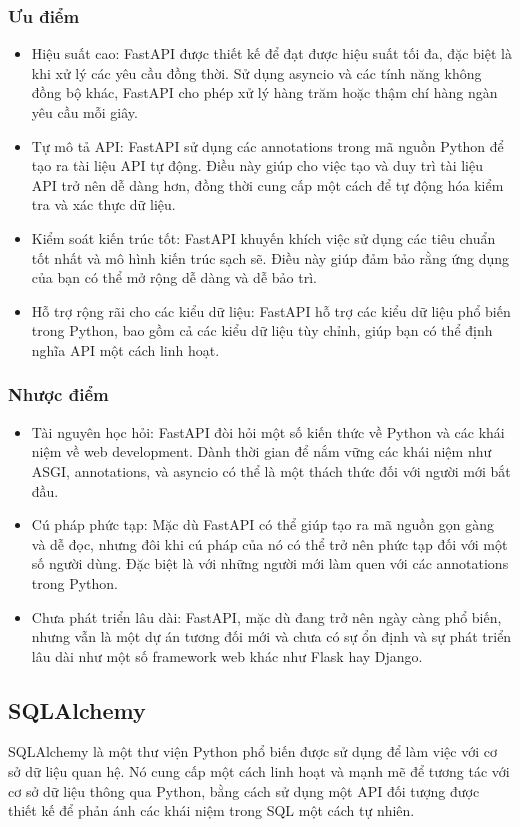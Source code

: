 \documentclass[a4paper]{article}
\begin{document}
\subsubsection{Ưu điểm}
\begin{itemize}
	\item Hiệu suất cao: FastAPI được thiết kế để đạt được hiệu suất tối đa, đặc biệt là khi xử lý các yêu cầu đồng thời. Sử dụng asyncio và các tính năng không đồng bộ khác, FastAPI cho phép xử lý hàng trăm hoặc thậm chí hàng ngàn yêu cầu mỗi giây.
    \item Tự mô tả API: FastAPI sử dụng các annotations trong mã nguồn Python để tạo ra tài liệu API tự động. Điều này giúp cho việc tạo và duy trì tài liệu API trở nên dễ dàng hơn, đồng thời cung cấp một cách để tự động hóa kiểm tra và xác thực dữ liệu.
    \item Kiểm soát kiến trúc tốt: FastAPI khuyến khích việc sử dụng các tiêu chuẩn tốt nhất và mô hình kiến trúc sạch sẽ. Điều này giúp đảm bảo rằng ứng dụng của bạn có thể mở rộng dễ dàng và dễ bảo trì.
    \item Hỗ trợ rộng rãi cho các kiểu dữ liệu: FastAPI hỗ trợ các kiểu dữ liệu phổ biến trong Python, bao gồm cả các kiểu dữ liệu tùy chỉnh, giúp bạn có thể định nghĩa API một cách linh hoạt.
\end{itemize}
\subsubsection{Nhược điểm}
\begin{itemize}
	\item Tài nguyên học hỏi: FastAPI đòi hỏi một số kiến thức về Python và các khái niệm về web development. Dành thời gian để nắm vững các khái niệm như ASGI, annotations, và asyncio có thể là một thách thức đối với người mới bắt đầu.
    \item Cú pháp phức tạp: Mặc dù FastAPI có thể giúp tạo ra mã nguồn gọn gàng và dễ đọc, nhưng đôi khi cú pháp của nó có thể trở nên phức tạp đối với một số người dùng. Đặc biệt là với những người mới làm quen với các annotations trong Python.
    \item Chưa phát triển lâu dài: FastAPI, mặc dù đang trở nên ngày càng phổ biến, nhưng vẫn là một dự án tương đối mới và chưa có sự ổn định và sự phát triển lâu dài như một số framework web khác như Flask hay Django.
\end{itemize}
\subsection{SQLAlchemy}
SQLAlchemy là một thư viện Python phổ biến được sử dụng để làm việc với cơ sở dữ liệu quan hệ. Nó cung cấp một cách linh hoạt và mạnh mẽ để tương tác với cơ sở dữ liệu thông qua Python, bằng cách sử dụng một API đối tượng được thiết kế để phản ánh các khái niệm trong SQL một cách tự nhiên.
\end{document}
